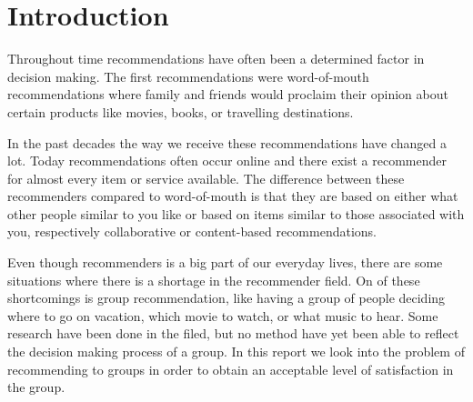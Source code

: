 \chapter{Introduction} 
Throughout time recommendations have often been a determined factor in decision making.
The first recommendations were word-of-mouth recommendations where family and friends would proclaim their opinion about certain products like movies, books, or travelling destinations. 

In the past decades the way we receive these recommendations have changed a lot. Today recommendations often occur online and there exist a recommender for almost every item or service available. The difference between these recommenders compared to word-of-mouth is that they are based on either what other people similar to you like or based on items similar to those associated with you, respectively collaborative or content-based recommendations.

Even though recommenders is a big part of our everyday lives, there are some situations where there is a shortage in the recommender field. On of these shortcomings is group recommendation, like having a group of people deciding where to go on vacation, which movie to watch, or what music to hear. Some research have been done in the filed, but no method have yet been able to reflect the decision making process of a group. In this report we look into the problem of recommending to groups in order to obtain an acceptable level of satisfaction in the group.

